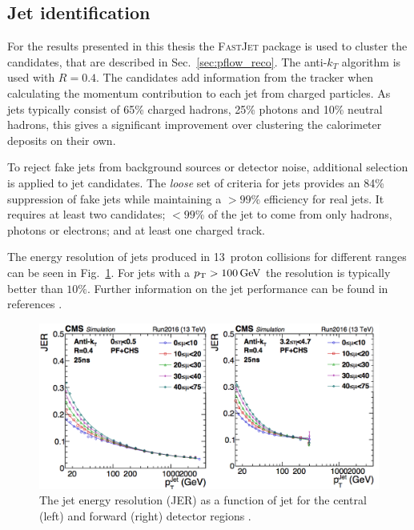 \subsection{Jet identification}

For the results presented in this thesis the \textsc{FastJet}
\cite{Cacciari2012} package is used to cluster the \PF candidates,
that are described in Sec.~\ref{sec:pflow_reco}. The
anti-$k_T$ algorithm is used with $R=0.4$. The \PF candidates
add information from the tracker when
calculating the momentum contribution to each jet from charged
particles. As jets typically consist of 65\% charged hadrons, 25\%
photons and 10\% neutral hadrons, this gives a significant improvement over
clustering the calorimeter deposits on their own. 

To reject fake jets from background sources or detector noise,
additional selection is applied to jet candidates. The \emph{loose} set of
criteria for jets provides an 84\% suppression of fake jets while
maintaining a $>99\%$ efficiency for real jets. It requires at least
two \PF candidates; $<99\%$ of the jet to come from only hadrons,
photons or electrons; and at least one charged track.

The energy resolution of jets produced in 13~\tev proton collisions for
different \eta ranges can be seen in Fig.~\ref{fig:jer}. For jets with a
${p_{\text T}}>100\mathrm{\,Ge\kern -0.1em V}$ the resolution is typically better than $10\%$. Further
information on the jet performance can be found in references
\cite{Khachatryan:2016kdb,CMS-PAS-JME-16-003,Kirschenmann:2014dla}.

\begin{figure}
\begin{center}
\includegraphics[width=0.9\linewidth]{figs/reconstruction/jer} \end{center}
\caption{The jet energy resolution (JER) as a function of jet \pT for
the central (left) and forward (right) detector regions
\cite{CMS-DP-2016-020}.}
\label{fig:jer} \end{figure}

